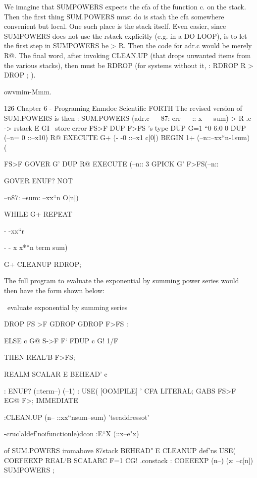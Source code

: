 {We imagine that SUMPOWERS expects the cfa of the function
c. on the stack. Then the first thing SUM.POWERS must do is
stash the cfa somewhere convenient but local. One such place is
the stack itself. Even easier, since SUMPOWERS does not use
the rstack explicitly (e.g. in a DO LOOP), is to let the first step
in SUMPOWERS be > R. Then the code for adr.c would be
merely R@. The final word, after invoking CLEAN.UP (that
drops unwanted items from the various stacks), then must be
RDROP (for systems without it, : RDROP R > DROP ; ).

owvmim-Mmm.

126 Chapter 6 - Programing Enmdoc Scientific FORTH
The revised version of SUM.POWERS is then
: SUM.POWERS (adr.c - - 87: err - - :: x - - sum)
> R \adr.c -> rstack
E GI \ store error
FS>F DUP F>FS \getx's type
DUP G=1 \x“0
6:0 0 DUP (--n= 0 ::--x10)
R@ EXECUTE G+ (- -0 ::--x1 c[0])
BEGIN 1+ (--n::--xx“n-1sum)
(

FS>F GOVER G'
DUP R@ EXECUTE (--n::
3 GPICK G' F>FS(--n::

GOVER
ENUF? NOT

--n87: --sum:
--xx“n O[n])

WHILE G+ REPEAT

- -xx“r

- - x x**n term sum)

G+ CLEANUP RDROP;

The full program to evaluate the exponential by summing power
series would then have the form shown below:

 

\ evaluate exponential by summing series

DROP FS >F
GDROP GDROP F>FS :

ELSE c G@ S->F
F‘ FDUP c G! 1/F

 

 

THEN REAL’B F>FS;

REALM SCALAR E BEHEAD' c \hidethisvariahie

: ENUF? (::term--) (--1) : USE( [OOMPILE] ' CFA LITERAL;
GABS FS>F EG@ F>; IMMEDIATE

:CLEAN.UP (n-- ::xx“nsum--sum) \thlsmeam'tseaddressot'

\--cruc'aldef'noifunctionle)dcon
:E“X (::x--e"x) %

 of SUM.POWERS iromabove \erroron87stack
BEHEAD" E CLEANUP \hidethese def'ns USE( COEFEEXP
REAL‘B SCALARC F=1 CG! \adr.constack
: COEEEXP (n--) (z: --c[n]) SUMPOWERS ;

}
